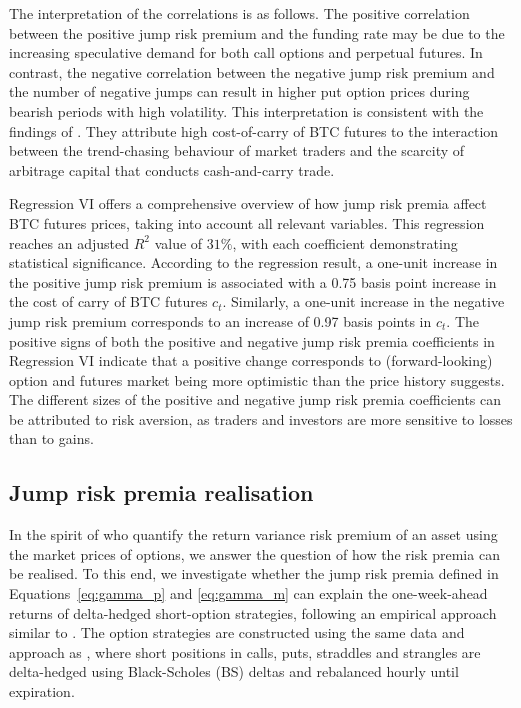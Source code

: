 \documentclass[11pt,a4paper]{article}
\numberwithin{equation}{section}
\theoremstyle{remark}
\theoremstyle{definition}
\begin{document}
The interpretation of the correlations is as follows.
The positive correlation between the positive jump risk premium and the funding rate may be due to the increasing speculative demand for both call options and perpetual futures.
In contrast, the negative correlation between the negative jump risk premium and the number of negative jumps can result in higher put option prices during bearish periods with high volatility.
This interpretation is consistent with the findings of \cite{schmeling2023crypto}.
They attribute high cost-of-carry of BTC futures to the interaction between the trend-chasing behaviour of market traders and the scarcity of arbitrage capital that conducts cash-and-carry trade.

Regression VI offers a comprehensive overview of how jump risk premia affect BTC futures prices, taking into account all relevant variables.
This regression reaches an adjusted $R^2$ value of $31\%$, with each coefficient demonstrating statistical significance.
According to the regression result, a one-unit increase in the
positive jump risk premium is associated with a 0.75 basis point increase in the cost of carry of BTC futures $c_t$.
 Similarly, a one-unit increase in the negative jump risk premium corresponds to an increase of 0.97 basis points in $c_t$.
The positive signs of both the positive and negative jump risk premia coefficients in Regression VI indicate that a positive change corresponds to (forward-looking) option and futures market being more optimistic than the price history suggests.
The different sizes of the positive and negative jump risk premia coefficients can be attributed to risk aversion, as traders and investors are more sensitive to losses than to gains.

\subsection{Jump risk premia realisation}\label{sec:PnL_realisation}
In the spirit of \cite{carr1998towards} who quantify the return variance risk premium of an asset using the market prices of options, we answer the question of how the risk premia can be realised. To this end, we investigate whether the jump risk premia defined in Equations~\eqref{eq:gamma_p} and \eqref{eq:gamma_m} can explain the one-week-ahead returns of delta-hedged short-option strategies, following an empirical approach similar to \cite{bakshi2003delta}. The option strategies are constructed using the same data and approach as \cite{lucicsepp2024}, where short positions in calls, puts, straddles and strangles are delta-hedged using Black-Scholes (BS) deltas and rebalanced hourly until expiration.
\end{document}
